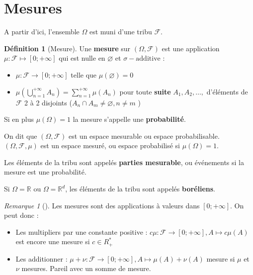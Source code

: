 \documentclass{article}
\theoremstyle{plain}%
\theoremstyle{definition}
\newtheorem{defn}{Définition}[section]
\theoremstyle{remark}
\newtheorem*{rem}{Remarque}
\begin{document}
\section{Mesures}
A partir d'ici, l'ensemble $ \Omega $ est muni d'une tribu $ \mathcal{F} $.
\begin{defn}[Mesure]
    Une \textbf{mesure} sur $ (\Omega , \mathcal{F}) $ est une application $ \mu : \mathcal{F} \mapsto [0;+\infty] $ qui est nulle en $ \varnothing  $ et $ \sigma-\text{additive} $ :\begin{itemize}
        \item $ \mu : \mathcal{F} \to [0;+\infty ] $ telle que $ \mu (\varnothing ) = 0 $ 
        \item $ \mu (\bigcup_{n=1}^{+\infty }A_n) = \sum_{n=1}^{+\infty } \mu (A_n) $ pour toute \textbf{suite} $ A_1,A_2,\dots, $ d'éléments de $ \mathcal{F} $ 2 à 2 disjoints ($ A_n \cap A_m \neq \varnothing, n \neq m $ )
    \end{itemize}
    Si en plus $ \mu (\Omega ) = 1 $ la mesure s'appelle une \textbf{probabilité}.
\end{defn}

On dit que $ (\Omega , \mathcal{F}) $ est un espace mesurable ou espace probabilisable. $ (\Omega , \mathcal{F}, \mu ) $ est un espace mesuré, ou espace probabilisé si $ \mu (\Omega )=1 $.

Les éléments de la tribu sont appelés \textbf{parties mesurable}, ou événements si la mesure est une probabilité.

Si $ \Omega = \mathbb{R} $ ou $ \Omega = \mathbb{R}^d $, les éléments de la tribu sont appelés \textbf{boréliens}.

\begin{rem}[]
    Les mesures sont des applications à valeurs dans $ [0;+\infty] $. On peut donc : \begin{itemize}
        \item Les multipliers par une constante positive : $ c \mu  : \mathcal{F} \to [0;+\infty ], A \mapsto c \mu (A)$ est encore une mesure si $ c \in R_+^* $ 
        \item Les additionner : $ \mu + \nu : \mathcal{F} \to [0 ; + \infty ], A \mapsto \mu (A) + \nu (A)$ mesure si $ \mu  $ et $ \nu  $ mesures. Pareil avec un somme de mesure.
    \end{itemize}
\end{rem}
\end{document}
